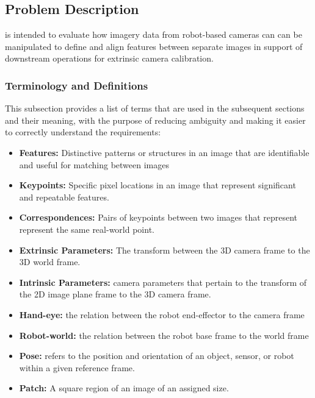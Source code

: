\documentclass[12pt]{article}
\begin{document}
\subsection{Problem Description} \label{Sec_pd}

\progname{} is intended to evaluate how imagery data from robot-based cameras can 
can be manipulated to define and align features between separate images in support 
of downstream operations for extrinsic camera calibration.

\subsubsection{Terminology and  Definitions}

This subsection provides a list of terms that are used in the subsequent
sections and their meaning, with the purpose of reducing ambiguity and making it
easier to correctly understand the requirements:

\begin{itemize}

\item \textbf{Features:} Distinctive patterns or structures in an image that are 
identifiable and useful for matching between images

\item \textbf{Keypoints:} Specific pixel locations in an image that represent 
significant and repeatable features.

\item \textbf{Correspondences:} Pairs of keypoints between two images that represent 
represent the same real-world point.

\item \textbf{Extrinsic Parameters:} The transform between the 3D camera frame to the 
3D world frame.

\item \textbf{Intrinsic Parameters:} camera parameters that pertain to the transform of the 
2D image plane frame to the 3D camera frame.

\item \textbf{Hand-eye:} the relation between the robot end-effector to the camera frame

\item \textbf{Robot-world:} the relation between the robot base frame to the world frame

\item \textbf{Pose:} refers to the position and orientation of an object, sensor, or robot 
within a given reference frame. 

\item \textbf{Patch:} A square region of an image of an assigned size.
\end{itemize}
\end{document}

